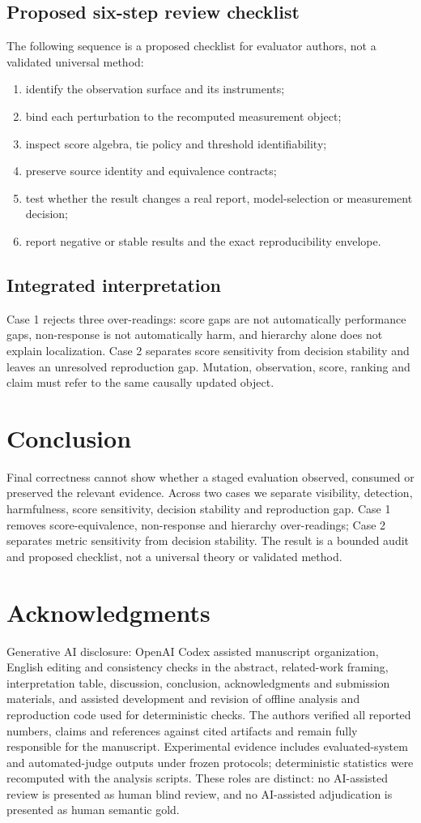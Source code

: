 \documentclass[10pt,conference]{IEEEtran}
\begin{document}
\subsection{Proposed six-step review checklist}
The following sequence is a proposed checklist for evaluator authors, not a validated universal method:
\begin{enumerate}
\item identify the observation surface and its instruments;
\item bind each perturbation to the recomputed measurement object;
\item inspect score algebra, tie policy and threshold identifiability;
\item preserve source identity and equivalence contracts;
\item test whether the result changes a real report, model-selection or measurement decision;
\item report negative or stable results and the exact reproducibility envelope.
\end{enumerate}
\subsection{Integrated interpretation}
Case 1 rejects three over-readings: score gaps are not automatically performance gaps, non-response is not automatically harm, and hierarchy alone does not explain localization. Case 2 separates score sensitivity from decision stability and leaves an unresolved reproduction gap. Mutation, observation, score, ranking and claim must refer to the same causally updated object.
\section{Conclusion}
Final correctness cannot show whether a staged evaluation observed, consumed or preserved the relevant evidence. Across two cases we separate visibility, detection, harmfulness, score sensitivity, decision stability and reproduction gap. Case 1 removes score-equivalence, non-response and hierarchy over-readings; Case 2 separates metric sensitivity from decision stability. The result is a bounded audit and proposed checklist, not a universal theory or validated method.
\section{Acknowledgments}
Generative AI disclosure: OpenAI Codex \cite{openai2026codex} assisted manuscript organization,
English editing and consistency checks in the abstract, related-work framing,
interpretation table, discussion, conclusion, acknowledgments and submission
materials, and assisted development and revision of offline analysis and
reproduction code used for deterministic checks. The authors verified all
reported numbers, claims and references against cited artifacts and remain
fully responsible for the manuscript. Experimental evidence includes
evaluated-system and automated-judge outputs under frozen protocols;
deterministic statistics were recomputed with the analysis scripts. These roles
are distinct: no AI-assisted review is presented as human blind review, and no
AI-assisted adjudication is presented as human semantic gold.
\end{document}
